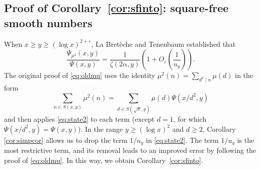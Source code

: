 \documentclass{amsart}
\theoremstyle{plain}
\theoremstyle{remark}
\begin{document}
\subsection{Proof of Corollary~\ref{cor:sfinto}: square-free smooth numbers}\label{sec:sfree}
When $x\ge y \ge (\log x)^{2+\varepsilon}$, La Bret\`eche and Tenenbaum \cite[Cor.~2.6]{DLBT20052} established that
\begin{equation}\label{eq:oldmu}
	\frac{\Psi_{\mu^2}(x,y)}{\Psi(x,y)}=\frac{1}{\zeta(2\alpha,y)} \left(1+ O_{\varepsilon}\left(\frac{1}{u_y}\right)\right).
\end{equation} 
The original proof of \eqref{eq:oldmu} uses the identity $\mu^2(n)=\sum_{d^2 \mid n} \mu(d)$ in the form
	\[ \sum_{n \in S(x,y)} \mu^2(n) = \sum_{d \in S(\sqrt{x},y)}\mu(d) \Psi(x/d^2,y)\] 
	and then applies \eqref{eq:state2} to each term (except $d=1$, for which $\Psi(x/d^2,y)=\Psi(x,y)$).
	In the range $y \ge (\log x)^2$ and $d \ge 2$, Corollary \ref{cor:simpcor} allows us to drop the term $1/u_y$ in \eqref{eq:state2}. The term $1/u_y$ is the most restrictive term, and its removal leads to an improved error by following the  proof of \eqref{eq:oldmu}. In this way, we obtain Corollary~\ref{cor:sfinto}.
\end{document}
